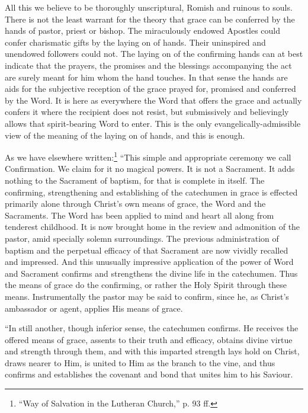 All this we believe to be thoroughly unscriptural,  Romish and ruinous to souls. There is not the least warrant for the theory that grace can be conferred by the hands of pastor, priest or bishop. The miraculously endowed Apostles could confer charismatic gifts by the laying on of hands. Their uninspired and unendowed followers could not. The laying on of the confirming hands can at best indicate that the prayers, the promises and the blessings accompanying the act are surely meant for him whom the hand touches. In that sense the hands are aids for the subjective reception of the grace prayed for, promised and conferred by the Word. It is here as everywhere the Word that offers the grace and actually confers it where the recipient does not resist, but submissively and believingly allows that spirit-bearing Word to enter. This is the only evangelically-admissible view of the meaning of the laying on of hands, and this is enough.

As we have elsewhere written:\footnote{“Way of Salvation in the Lutheran Church,” p. 93 ff.} “This simple and appropriate ceremony we call Confirmation. We claim for it no magical powers. It is not a
Sacrament. It adds nothing to the Sacrament of baptism, for that is complete in itself. The confirming, strengthening and establishing  of the catechumen in grace is effected primarily alone through Christ’s own means of grace, the Word and the Sacraments. The Word has been applied to mind and heart all along from tenderest childhood. It is now brought home in the review and admonition of the pastor, amid specially solemn surroundings. The previous administration of baptism and the perpetual efficacy of that Sacrament are now vividly recalled and impressed. And this unusually impressive application of the power of Word and Sacrament confirms and strengthens the divine life in the catechumen. Thus the means of grace do the confirming, or rather the Holy Spirit through these means. Instrumentally the pastor may be said to confirm, since he, as Christ’s ambassador or agent, applies His means of grace.


“In still another, though inferior sense, the catechumen confirms. He receives the offered means of grace, assents to their truth and efficacy, obtains divine virtue and strength through them, and with this imparted strength lays hold on Christ, draws nearer to Him, is united to Him as the branch to the vine, and thus confirms and establishes the covenant and bond that unites him to his Saviour.


